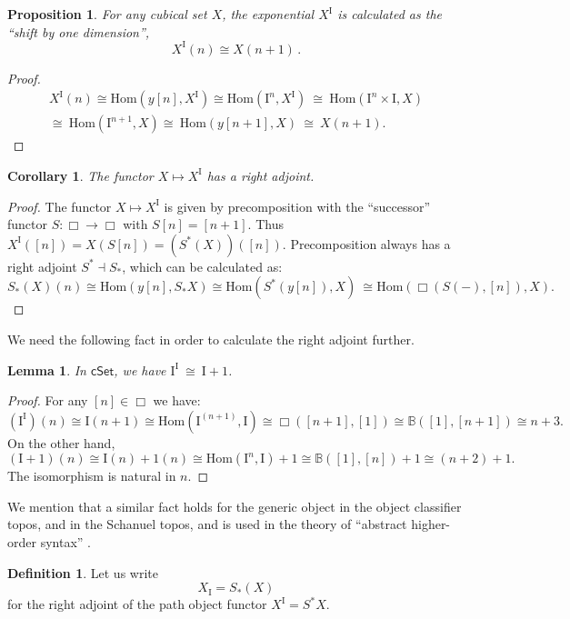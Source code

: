 \documentclass[11pt]{amsart}
\newcommand{\B}{\ensuremath{\mathbb{B}}}
\newcommand{\cSet}{\ensuremath{\mathsf{cSet}}}
\renewcommand{\to}{\ensuremath{\rightarrow}}
\newcommand{\Hom}{\ensuremath{\mathrm{Hom}}}
\renewcommand{\hom}{\ensuremath{\mathrm{Hom}}}
\newcommand{\I}{\ensuremath{\mathrm{I}}}
\renewcommand{\H}{\ensuremath{\Box}}
\newcommand{\HH}{\ensuremath{\cSet}}
\newtheorem{proposition}[theorem]{Proposition}
\newtheorem{lemma}[theorem]{Lemma}
\newtheorem{corollary}[theorem]{Corollary}
\theoremstyle{remark}
\theoremstyle{definition}
\newtheorem{definition}[theorem]{Definition}
\begin{document}
\begin{proposition}\label{prop:pathobject}
For any cubical set $X$, the exponential $X^\I$ is calculated as the ``shift by one dimension'', 
\[
X^\I(n) \cong X(n+1)\,.
\]
\end{proposition}

\begin{proof}
\[
\begin{split}
X^\I(n) \cong \hom(y[n], X^\I) \cong \hom(\I^n, X^\I)\ \cong\ \hom(\I^n\times \I, X)\\
\cong\ \hom(\I^{n+1}, X)\cong\ \hom(y[n+1], X)\ \cong\ X(n+1).
\end{split}
\]
\end{proof}

\begin{corollary}\label{cor:rightadjpath}
The functor $X \mapsto X^\I$ has a \emph{right} adjoint.
\end{corollary}
\begin{proof}
The functor $X \mapsto X^\I$ is given by precomposition with the ``successor'' functor $S : \H\to\H$ with $S[n] = [n+1]$.  Thus $X^\I([n]) = X(S[n]) = (S^*(X))([n])$.  Precomposition always has a right adjoint $S^* \dashv S_*$, which can be calculated as:
\[
S_*(X)(n) \cong \hom(y[n], S_*X) \cong \hom(S^*(y[n]), X)\ \cong \hom(\H(S(-), [n]), X).
\]
\end{proof}

We need the following fact in order to calculate the right adjoint further.

\begin{lemma}\label{lemma:binomial}
In $\HH$, we have $\I^\I\ \cong\ \I+1$.
\end{lemma}
\begin{proof}
For any $[n] \in \H$ we have:
\[
(\I^\I)(n) \cong \I(n+1) \cong \Hom(\I^{(n+1)},\I)\cong \H([n+1],[1])\cong \B([1], [n+1])\cong n+3.
\]
On the other hand,
\[
(\I+1)(n) \cong \I(n) + 1(n) \cong \Hom(\I^n, \I) + 1 \cong \B([1],[n]) +1 \cong (n+2) +1.
\]
The isomorphism is natural in $n$.
\end{proof}
%
We mention that a similar fact holds for the generic object in the object classifier topos, and in the Schanuel topos, and is used in the theory of ``abstract higher-order syntax'' \cite{Pitts,Fiore}.


\begin{definition}
Let us write
\[
X_\I = S_*(X)
\]
for the right adjoint of the path object functor $X^\I = S^*X$.
\end{definition}
\end{document}
